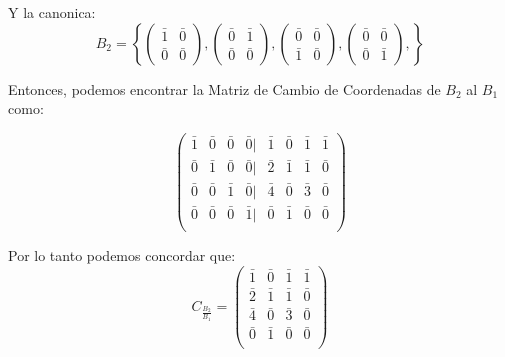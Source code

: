 \documentclass[12pt]{article}							    %
\begin{document}
Y la canonica:
\begin{equation*}
    B_2 = \left\{
        \begin{pmatrix}\bar{1}&\bar{0}\\\bar{0}&\bar{0}\end{pmatrix},
        \begin{pmatrix}\bar{0}&\bar{1}\\\bar{0}&\bar{0}\end{pmatrix},
        \begin{pmatrix}\bar{0}&\bar{0}\\\bar{1}&\bar{0}\end{pmatrix},
        \begin{pmatrix}\bar{0}&\bar{0}\\\bar{0}&\bar{1}\end{pmatrix},
    \right\}
\end{equation*}

Entonces, podemos encontrar la Matriz de Cambio de Coordenadas de $B_2$ al $B_1$ como:


\begin{equation*}
    \begin{pmatrix}
        \bar{1} & \bar{0} & \bar{0} & \bar{0} | & \bar{1} & \bar{0} & \bar{1} & \bar{1} \\
        \bar{0} & \bar{1} & \bar{0} & \bar{0} | & \bar{2} & \bar{1} & \bar{1} & \bar{0} \\
        \bar{0} & \bar{0} & \bar{1} & \bar{0} | & \bar{4} & \bar{0} & \bar{3} & \bar{0} \\
        \bar{0} & \bar{0} & \bar{0} & \bar{1} | & \bar{0} & \bar{1} & \bar{0} & \bar{0} \\
    \end{pmatrix}
\end{equation*}

Por lo tanto podemos concordar que:
\begin{equation*}
    C_{\frac{B_2}{B_1}} = 
    \begin{pmatrix}
        \bar{1} & \bar{0} & \bar{1} & \bar{1} \\
        \bar{2} & \bar{1} & \bar{1} & \bar{0} \\
        \bar{4} & \bar{0} & \bar{3} & \bar{0} \\
        \bar{0} & \bar{1} & \bar{0} & \bar{0} \\
    \end{pmatrix}
\end{equation*}
\end{document}
